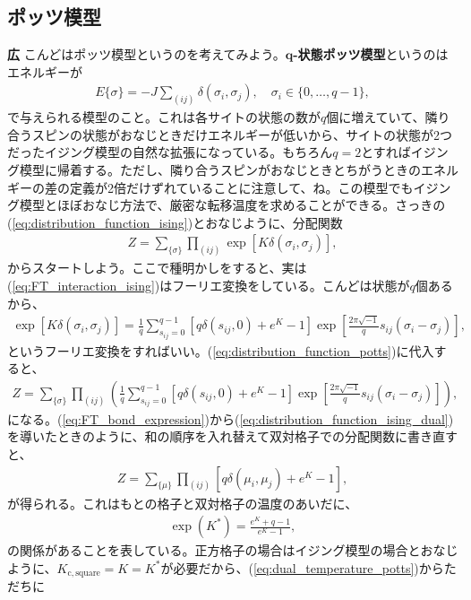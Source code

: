 \documentclass[paper=b5j,fontsize=12Q,jafontsize=12Q,baselineskip=21Q]{jlreq}
\DeclareRobustCommand{\hiron}{\textbf{広 }}
\begin{document}
\begin{refsection}
\subsection{ポッツ模型}
\hiron こんどはポッツ模型というのを考えてみよう。\textbf{$\bm q$-状態ポッツ模型}というのはエネルギーが
\begin{align}
  E\{\sigma\}=-J\sum_{(ij)}\delta(\sigma_i,\sigma_j),\quad \sigma_i\in\{0,\dots,q-1\},
\end{align}
で与えられる模型のこと。これは各サイトの状態の数が$q$個に増えていて、隣り合うスピンの状態がおなじときだけエネルギーが低いから、サイトの状態が2つだったイジング模型の自然な拡張になっている。もちろん$q=2$とすればイジング模型に帰着する。ただし、隣り合うスピンがおなじときとちがうときのエネルギーの差の定義が2倍だけずれていることに注意して、ね。この模型でもイジング模型とほぼおなじ方法で、厳密な転移温度を求めることができる。さっきの(\ref{eq:distribution_function_ising})とおなじように、分配関数
\begin{align}
  Z=\sum_{\{\sigma\}}\prod_{(ij)}\exp\left[K\delta(\sigma_i,\sigma_j)\right],\label{eq:distribution_function_potts}
\end{align}
からスタートしよう。ここで種明かしをすると、実は(\ref{eq:FT_interaction_ising})はフーリエ変換をしている。こんどは状態が$q$個あるから、
\begin{align}
  \exp\left[K\delta(\sigma_i,\sigma_j)\right]=\frac1q\sum_{s_{ij}=0}^{q-1}\left[q\delta(s_{ij},0)+e^K-1\right]\exp\left[\frac{2\pi\sqrt{-1}}{q}s_{ij}(\sigma_i-\sigma_j)\right],
\end{align}
というフーリエ変換をすればいい。(\ref{eq:distribution_function_potts})に代入すると、
\begin{align}
  Z=\sum_{\{\sigma\}}\prod_{(ij)}\left(\frac1q\sum_{s_{ij}=0}^{q-1}\left[q\delta(s_{ij},0)+e^K-1\right]\exp\left[\frac{2\pi\sqrt{-1}}{q}s_{ij}(\sigma_i-\sigma_j)\right]\right),
\end{align}
になる。(\ref{eq:FT_bond_expression})から(\ref{eq:distribution_function_ising_dual})を導いたときのように、和の順序を入れ替えて双対格子での分配関数に書き直すと、
\begin{align}
  Z=\sum_{\{\mu\}}\prod_{(ij)}\left[q\delta(\mu_i,\mu_j)+e^K-1\right],
\end{align}
が得られる。これはもとの格子と双対格子の温度のあいだに、
\begin{align}
  \exp(K^\ast)=\frac{e^K+q-1}{e^K-1},\label{eq:dual_temperature_potts}
\end{align}
の関係があることを表している。正方格子の場合はイジング模型の場合とおなじように、$K_{\mathrm{c,square}}=K=K^\ast$が必要だから、(\ref{eq:dual_temperature_potts})からただちに

\end{refsection}
\end{document}
